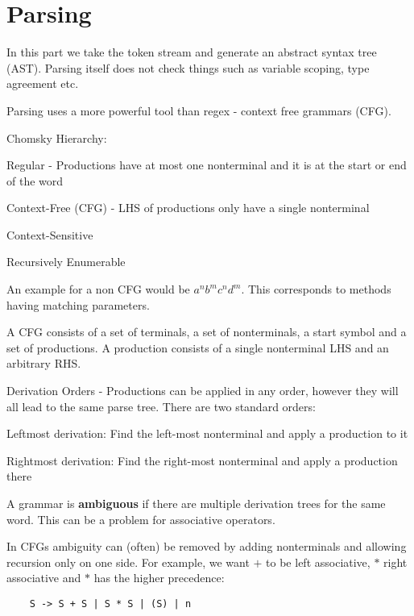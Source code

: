 \section*{Parsing}

In this part we take the token stream and generate an abstract syntax tree (AST). Parsing itself does not check things such as variable scoping, type agreement etc. \medskip

Parsing uses a more powerful tool than regex - context free grammars (CFG). \medskip

Chomsky Hierarchy:
\begin{compactitem}[$\quad\bullet$]
	\item Regular - Productions have at most one nonterminal and it is at the start or end of the word
	\item Context-Free (CFG) - LHS of productions only have a single nonterminal
	\item Context-Sensitive
	\item Recursively Enumerable
\end{compactitem}

An example for a non CFG would be $a^n b^m c^n d^m$. This corresponds to methods having matching parameters.\medskip

A CFG consists of a set of terminals, a set of nonterminals, a start symbol and a set of productions. A production consists of a single nonterminal LHS and an arbitrary RHS. \medskip

Derivation Orders - Productions can be applied in any order, however they will all lead to the same parse tree. There are two standard orders:
\begin{compactitem}[$\quad\bullet$]
	\item Leftmost derivation: Find the left-most nonterminal and apply a production to it
	\item Rightmost derivation: Find the right-most nonterminal and apply a production there
\end{compactitem}

A grammar is \textbf{ambiguous} if there are multiple derivation trees for the same word. This can be a problem for associative operators. \medskip

In CFGs ambiguity can (often) be removed by adding nonterminals and allowing recursion only on one side. For example, we want $+$ to be left associative, $*$ right associative and $*$ has the higher precedence:\smallskip

\begin{lstlisting}
	S -> S + S | S * S | (S) | n
\end{lstlisting} \smallskip

